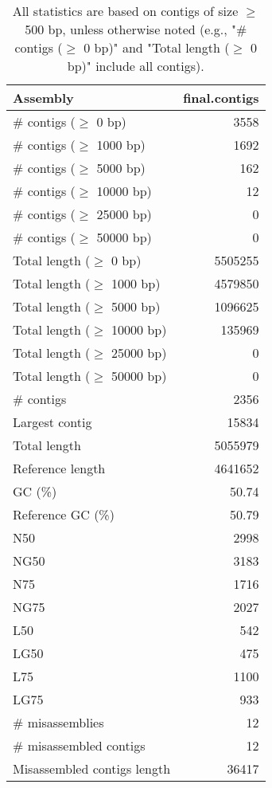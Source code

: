 \documentclass[12pt,a4paper]{article}
\begin{document}
\begin{table}[ht]
\begin{center}
\caption{All statistics are based on contigs of size $\geq$ 500 bp, unless otherwise noted (e.g., "\# contigs ($\geq$ 0 bp)" and "Total length ($\geq$ 0 bp)" include all contigs).}
\begin{tabular}{|l*{1}{|r}|}
\hline
Assembly & final.contigs \\ \hline
\# contigs ($\geq$ 0 bp) & 3558 \\ \hline
\# contigs ($\geq$ 1000 bp) & 1692 \\ \hline
\# contigs ($\geq$ 5000 bp) & 162 \\ \hline
\# contigs ($\geq$ 10000 bp) & 12 \\ \hline
\# contigs ($\geq$ 25000 bp) & 0 \\ \hline
\# contigs ($\geq$ 50000 bp) & 0 \\ \hline
Total length ($\geq$ 0 bp) & 5505255 \\ \hline
Total length ($\geq$ 1000 bp) & 4579850 \\ \hline
Total length ($\geq$ 5000 bp) & 1096625 \\ \hline
Total length ($\geq$ 10000 bp) & 135969 \\ \hline
Total length ($\geq$ 25000 bp) & 0 \\ \hline
Total length ($\geq$ 50000 bp) & 0 \\ \hline
\# contigs & 2356 \\ \hline
Largest contig & 15834 \\ \hline
Total length & 5055979 \\ \hline
Reference length & 4641652 \\ \hline
GC (\%) & 50.74 \\ \hline
Reference GC (\%) & 50.79 \\ \hline
N50 & 2998 \\ \hline
NG50 & 3183 \\ \hline
N75 & 1716 \\ \hline
NG75 & 2027 \\ \hline
L50 & 542 \\ \hline
LG50 & 475 \\ \hline
L75 & 1100 \\ \hline
LG75 & 933 \\ \hline
\# misassemblies & 12 \\ \hline
\# misassembled contigs & 12 \\ \hline
Misassembled contigs length & 36417 \\ \hline

\end{tabular}
\end{center}
\end{table}
\end{document}
